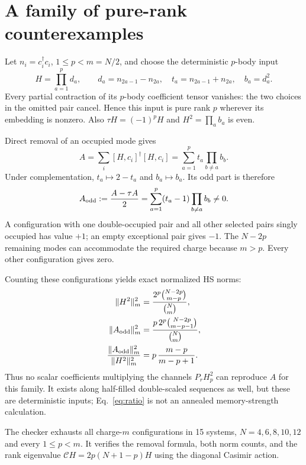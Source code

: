 \documentclass[11pt,a4paper]{article}
\begin{document}
\newpage
\section{A family of pure-rank counterexamples}
Let $n_i=c_i^\dagger c_i$, $1\le p<m=N/2$, and choose the deterministic
$p$-body input
\begin{equation}
 H=\prod_{a=1}^p d_a,\qquad
 d_a=n_{2a-1}-n_{2a},\quad
 t_a=n_{2a-1}+n_{2a},\quad b_a=d_a^2.
\end{equation}
Every partial contraction of its $p$-body coefficient tensor vanishes:
the two choices in the omitted pair cancel. Hence this input is pure
rank $p$ wherever its embedding is nonzero. Also
$\tau H=(-1)^pH$ and $H^2=\prod_a b_a$ is even.

Direct removal of an occupied mode gives
\begin{equation}
 A=\sum_i[H,c_i]^\dagger[H,c_i]
   =\sum_{a=1}^p t_a\prod_{b\ne a}b_b.
\end{equation}
Under complementation, $t_a\mapsto2-t_a$ and $b_a\mapsto b_a$.
Its odd part is therefore
\begin{equation}
 A_{\rm odd}:=\frac{A-\tau A}{2}
       =\sum_{a=1}^p(t_a-1)\prod_{b\ne a}b_b\ne0.
 \label{eq:odd}
\end{equation}
A configuration with one double-occupied pair and all other selected
pairs singly occupied has value $+1$; an empty exceptional pair gives
$-1$. The $N-2p$ remaining modes can accommodate the required charge
because $m>p$. Every other configuration gives zero.

Counting these configurations yields exact normalized HS norms:
\begin{align}
 \|H^2\|_m^2
 &=\frac{2^p\binom{N-2p}{m-p}}{\binom Nm},\\
 \|A_{\rm odd}\|_m^2
 &=\frac{p\,2^p\binom{N-2p}{m-p-1}}{\binom Nm},\\
 \frac{\|A_{\rm odd}\|_m^2}{\|H^2\|_m^2}
 &=p\,\frac{m-p}{m-p+1}.
 \label{eq:ratio}
\end{align}
Thus no scalar coefficients multiplying the channels $P_rH_p^2$
can reproduce $A$ for this family. It exists along half-filled
double-scaled sequences as well, but these are deterministic inputs;
Eq.~\eqref{eq:ratio} is not an annealed memory-strength calculation.

The checker exhausts all charge-$m$ configurations in 15 systems,
$N=4,6,8,10,12$ and every $1\le p<m$. It verifies the removal formula,
both norm counts, and the rank eigenvalue
$\mathcal C H=2p(N+1-p)H$ using the diagonal Casimir action.
\end{document}
